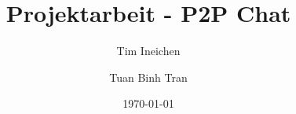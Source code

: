 \documentclass{article}
\title{Projektarbeit - P2P Chat}
\author{
    Tim Ineichen
    \and
    Tuan Binh Tran
}
\date{\today}
\begin{document}
\maketitle
\newpage

\renewcommand{\contentsname}{Inhaltsverzeichnis}
\tableofcontents
\newpage







\end{document}
